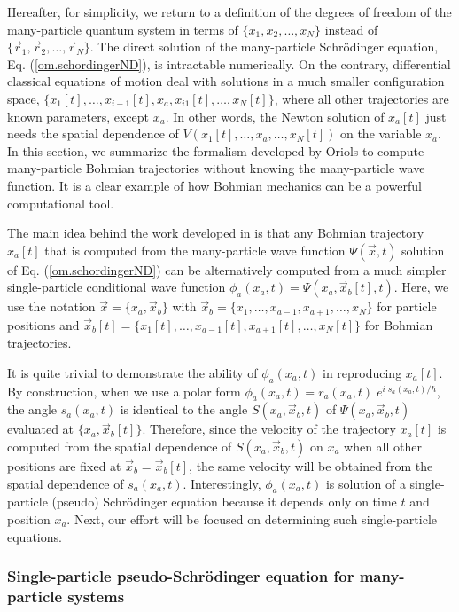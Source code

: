\documentclass[nofootinbib, secnumarabic, amsmath, nobibnotes,11pt,aps,pra, floatfix]{revtex4-1}
\newcommand{\eref}[1]{Eq. (\ref{#1})}
\begin{document}
Hereafter, for simplicity, we return to a definition of the degrees
of freedom of the many-particle quantum system in terms of 
$\{x_1, x_2,\ldots ,x_N\}$ instead of $\{ \vec r_1,\vec r_2, \ldots
,\vec r_N \}$. The direct solution of  the many-particle
Schr\"odinger equation, \eref{om.schordingerND}, is intractable
numerically. On the contrary, differential classical
equations of motion deal with solutions in a much smaller configuration
space,  $\{x_1[t],\ldots,x_{i -
1}[t],x_a,x_{i1}[t],\ldots,x_N[t]\}$, where all other trajectories
are known parameters, except $x_a$. In other words, the Newton
solution of $x_a[t]$ just needs the spatial dependence of
$V(x_1[t],\ldots,x_a,\ldots,x_N[t])$ on the variable $x_a$. In this
section, we summarize the formalism developed by Oriols \cite{om.oriolsprl} to compute many-particle Bohmian trajectories
without knowing the many-particle wave function. It is a clear
example of how Bohmian mechanics can be a powerful computational 
tool.

The main idea behind the work developed in \cite{om.oriolsprl} is
that any Bohmian trajectory $x_a[t]$ that is computed from the
many-particle wave function $\Psi(\vec x,t)$ solution of
\eref{om.schordingerND} can be alternatively computed from a much
simpler single-particle conditional wave function $\phi_a(x_a,t) = \Psi(x_a,\vec
x_b[t],t)$. Here, we use the notation $\vec x = \{x_a,\vec x_b\}$
with $\vec x_b = \{x_1,\ldots,x_{a-1},x_{a + 1},\ldots,x_N\}$ for
particle positions and $\vec x_b[t] =
\{x_1[t],\ldots,x_{a-1}[t],x_{a + 1}[t],\ldots,x_N[t]\}$ for Bohmian
trajectories.

It is quite trivial to demonstrate the ability of $\phi_a(x_a,t)$ in
reproducing $x_a[t]$. By construction, when we use a polar form
$\phi_a(x_a,t) = r_a(x_a,t) \; e^{i \; s_a(x_a,t)/\hbar}$, the angle
$s_a(x_a,t)$ is identical to the angle $S(x_a,\vec x_b,t)$ of
$\Psi(x_a,\vec x_b,t)$ evaluated at $\{x_a,\vec x_b[t]\}$.
Therefore, since the velocity of the trajectory $x_a[t]$ is computed
from the spatial dependence of $S(x_a,\vec x_b,t)$ on $x_a$ when all
other positions are fixed at $\vec x_b = \vec x_b[t]$, the same
velocity will be obtained from the spatial dependence of
$s_a(x_a,t)$. Interestingly, $\phi_a(x_a,t)$ is solution of a
single-particle (pseudo) Schr\"odinger equation because it depends
only on time $t$ and position $x_a$. Next, our effort will be
focused on determining such single-particle  equations.

\subsubsection{Single-particle pseudo-Schr\"odinger equation for many-particle systems}
\end{document}
